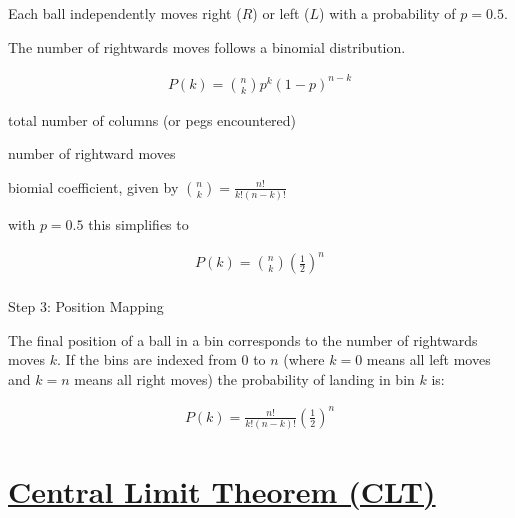 \documentclass[
  a4paper,
]{scrbook}
\makeatletter
\let\oldparagraph\paragraph
\renewcommand{\paragraph}{
    \@ifstar
      \xxxParagraphStar
      \xxxParagraphNoStar
  }
\newcommand{\xxxParagraphStar}[1]{\oldparagraph*{#1}\mbox{}}
\newcommand{\xxxParagraphNoStar}[1]{\oldparagraph{#1}\mbox{}}
\providecommand{\tightlist}{%
  \setlength{\itemsep}{0pt}\setlength{\parskip}{0pt}}\usepackage{longtable,booktabs,array}
\let\olddescription\description
\let\endolddescription\enddescription
\renewenvironment{description}{
          \begin{spacing}{1.5}\olddescription
        }{
          \endolddescription\end{spacing}
        }
\makeatother
\begin{document}
Each ball independently moves right (\(R\)) or left (\(L\)) with a
probability of \(p=0.5\).

The number of rightwards moves follows a binomial distribution.

\begin{align}
P(k) = \binom{n}{k} p^k (1 - p)^{n - k} 
\end{align}

\begin{description}
\tightlist
\item[\(n\)]
total number of columns (or pegs encountered)
\item[\(k\)]
number of rightward moves
\item[\(\binom{n}{k}\)]
biomial coefficient, given by \(\binom{n}{k} = \frac{n!}{k!(n-k)!}\)
\end{description}

with \(p = 0.5\) this simplifies to

\begin{align}
P(k) = \binom{n}{k} ( \frac{1}{2})^n
\end{align}

\paragraph{Step 3: Position Mapping}\label{step-3-position-mapping}

The final position of a ball in a bin corresponds to the number of
rightwards moves \(k\). If the bins are indexed from \(0\) to \(n\)
(where \(k=0\) means all left moves and \(k=n\) means all right moves)
the probability of landing in bin \(k\) is:

\begin{align}
P(k) = \frac{n!}{k!(n-k)!}(\frac{1}{2})^n
\end{align}

\section{\texorpdfstring{\hyperref[acronyms_CLT]{Central Limit Theorem
(CLT)}}{Central Limit Theorem (CLT)}}\label{section}
\end{document}
